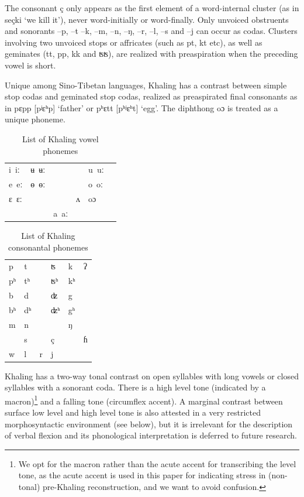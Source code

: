 \documentclass[oldfontcommands,oneside,a4paper,11pt]{article}
\newcommand{\ipa}[1]{{\phon \mbox{#1}}} %
\begin{document}
The consonant \ipa{ç} only appears as the first element of a word-internal cluster (as in \ipa{seçki} `we kill it'), never word-initially or word-finally. Only unvoiced obstruents and sonorants \ipa{--p}, \ipa{--t} \ipa{--k}, \ipa{--m}, \ipa{--n}, \ipa{--ŋ}, \ipa{--r}, \ipa{--l}, \ipa{--s} and \ipa{--j} can occur as codas. Clusters involving two unvoiced stops or affricates (such as \ipa{pt}, \ipa{kt} etc), as well as geminates (\ipa{tt}, \ipa{pp}, \ipa{kk} and \ipa{ʦʦ}), are realized with preaspiration when the preceding vowel is short.

Unique among Sino-Tibetan languages, Khaling has a contrast between simple stop codas and geminated stop codas, realized as preaspirated final consonants as in \ipa{pɛpp} [\ipa{pʲɛʰp}] `father'  or \ipa{pʰɛtt} [\ipa{pʰʲɛʰt}] `egg'. The diphthong \ipa{oɔ} is treated as a unique phoneme.

\begin{table}[h]
\caption{List of Khaling vowel phonemes} \label{tab:vowels}\centering
\begin{tabular}{llllll}
\ipa{i iː} & \ipa{ʉ ʉː} & &&\ipa{u uː} \\
\ipa{e eː} & \ipa{ɵ ɵː} & &&\ipa{o oː} \\
\ipa{ɛ ɛː} &   & &\ipa{ʌ} &  \ipa{oɔ} \\
&&\ipa{a aː}\\
\end{tabular}
\end{table}

\begin{table}[h]
\caption{List of Khaling consonantal phonemes} \label{tab:consonants}\centering
\begin{tabular}{llllll}
\ipa{p} & \ipa{t} &&\ipa{ʦ}  & \ipa{k}&\ipa{ʔ}\\
\ipa{pʰ} & \ipa{tʰ} &&\ipa{ʦʰ}  & \ipa{kʰ}&\\
\ipa{b} & \ipa{d} &&\ipa{ʣ}  & \ipa{g}&\\
\ipa{bʰ} & \ipa{dʰ} &&\ipa{ʣʰ}  & \ipa{gʰ}&\\
\ipa{m} & \ipa{n} && & \ipa{ŋ}&\\
  & \ipa{s} && \ipa{ç}& &\ipa{ɦ}\\
  \ipa{w} & \ipa{l} &\ipa{r}&\ipa{j}  & &\\
\end{tabular}
\end{table}

Khaling has a two-way tonal contrast on open syllables with long vowels or closed syllables with a sonorant coda. There is a high level tone (indicated by a macron)\footnote{We opt for the macron rather than the acute accent for transcribing the level tone, as the acute accent is used in this paper for indicating stress in (non-tonal) pre-Khaling reconstruction, and we want to avoid confusion.} and a falling tone (circumflex accent). A marginal contrast between surface low level and high level tone is also attested in a very restricted morphosyntactic environment (see below), but it is irrelevant for the description of verbal flexion and its phonological interpretation is deferred to future research.
\end{document}
